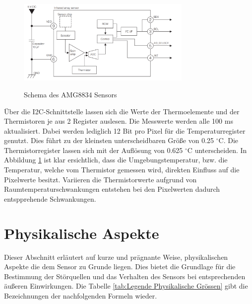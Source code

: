 \begin{figure}[H]
	\centering
	\includegraphics[width=0.75\textwidth]
	{fig/Circuit_AMG8834.PNG}
	\caption[Schema des AMG8834 Sensors]{Schema des AMG8834 Sensors} \protect\cite{AMG8834}
	\label{fig:SchemaAMG8834}
\end{figure}
 
Über die \ac{I2C}-Schnittstelle lassen sich die Werte der Thermoelemente und der Thermistoren je aus 2 Register auslesen. Die Messwerte werden alle 100 ms aktualisiert. Dabei werden lediglich 12 Bit pro Pixel für die Temperaturregister genutzt. Dies führt zu der kleinsten unterscheidbaren Größe von 0.25 $^\circ$C. Die Thermistorregister lassen sich mit der Auflösung von 0.625 $^\circ$C unterscheiden. In Abbildung \ref{fig:SchemaAMG8834} ist klar ersichtlich, dass die Umgebungstemperatur, bzw. die Temperatur, welche vom Thermistor gemessen wird, direkten Einfluss auf die Pixelwerte besitzt. Variieren die Thermistorwerte aufgrund von Raumtemperaturschwankungen entstehen bei den Pixelwerten dadurch entspprehende Schwankungen.

\section{Physikalische Aspekte}
\label{sec:Physik}
Dieser Abschnitt erläutert auf kurze und prägnante Weise, physikalischen Aspekte die dem Sensor zu Grunde liegen. Dies bietet die Grundlage für die Bestimmung der Störquellen und das Verhalten des Sensors bei entsprechenden äußeren Einwirkungen. Die Tabelle \ref{tab:Legende Physikalische Grössen} gibt die Bezeichnungen der nachfolgenden Formeln wieder.

